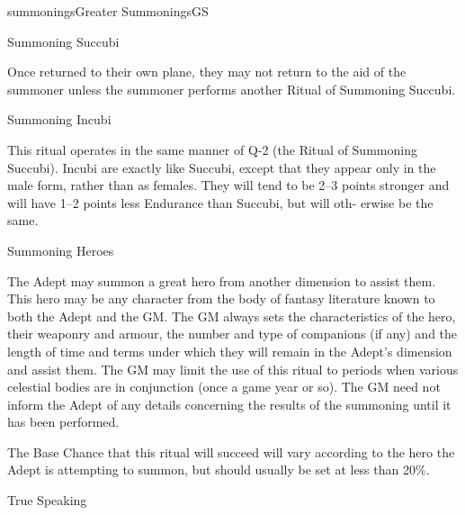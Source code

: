 \begin{College}[1.0]{summonings}{Greater Summonings}{GS}
\begin{ritual}[Q-2]{Summoning Succubi}
\begin{effects}
Once returned to their own plane, they may not return to the aid of
the summoner unless the summoner performs another Ritual of Summoning
Succubi.
\end{effects}
\end{ritual}

\begin{ritual}[Q-3]{Summoning Incubi}

\begin{effects}
This ritual operates in the same manner of Q-2 (the Ritual of
Summoning Succubi).  Incubi are exactly like Succubi, except that they
appear only in the male form, rather than as females. They will tend
to be 2–3 points stronger and will have 1–2 points less Endurance than
Succubi, but will oth- erwise be the same.
\end{effects}
\end{ritual}

\begin{ritual}[Q-4]{Summoning Heroes}

\begin{effects}
The Adept may summon a great hero from another dimension to assist
them. This hero may be any character from the body of fantasy
literature known to both the Adept and the GM.  The GM always sets the
characteristics of the hero, their weaponry and armour, the number and
type of companions (if any) and the length of time and terms under
which they will remain in the Adept’s dimension and assist them. The
GM may limit the use of this ritual to periods when various celestial
bodies are in conjunction (once a game year or so).  The GM need not
inform the Adept of any details concerning the results of the
summoning until it has been performed.

The Base Chance that this ritual will succeed will vary according to
the hero the Adept is attempting to summon, but should usually be set
at less than 20\%.
\end{effects}
\end{ritual}

\begin{ritual}[Q-5]{True Speaking}


\end{ritual}
\end{College}
